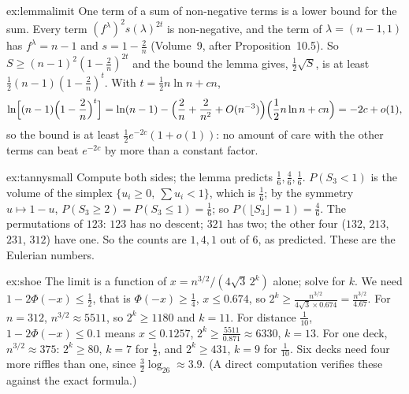 \begin{solution}{ex:lemmalimit}
\idea One term of a sum of non-negative terms is a lower bound for the sum.
\writeup Every term $(f^\lambda)^2s(\lambda)^{2t}$ is non-negative, and the term of $\lambda=(n-1,1)$ has $f^\lambda=n-1$ and $s=1-\frac2n$ (Volume~9, after Proposition~10.5). So $S\ge(n-1)^2(1-\frac2n)^{2t}$ and the bound
the lemma gives, $\frac12\sqrt S$, is at least $\frac12(n-1)(1-\frac2n)^t$. With $t=\frac12n\ln n+cn$,
\[
\ln\Bigl[(n-1)\Bigl(1-\frac2n\Bigr)^t\Bigr]=\ln(n-1)-\Bigl(\frac2n+\frac2{n^2}+O(n^{-3})\Bigr)\Bigl(\frac12n\ln n+cn\Bigr)=-2c+o(1),
\]
so the bound is at least $\frac12e^{-2c}(1+o(1))$: no amount of care with the other terms can beat $e^{-2c}$ by more than a constant factor.
\end{solution}

\begin{solution}{ex:tannysmall}
\idea Compute both sides; the lemma predicts $\frac16,\frac46,\frac16$.
\writeup $P(S_3<1)$ is the volume of the simplex $\{u_i\ge0,\ \sum u_i<1\}$, which is $\frac16$; by the symmetry $u\mapsto1-u$, $P(S_3\ge2)=P(S_3\le1)=\frac16$; so $P(\lfloor S_3\rfloor=1)=\frac46$. The permutations
of $123$: $123$ has no descent; $321$ has two; the other four ($132$, $213$, $231$, $312$) have one. So the counts are $1,4,1$ out of $6$, as predicted. These are the Eulerian numbers.
\end{solution}

\begin{solution}{ex:shoe}
\idea The limit is a function of $x=n^{3/2}/(4\sqrt3\,2^k)$ alone; solve for $k$.
\writeup We need $1-2\Phi(-x)\le\frac12$, that is $\Phi(-x)\ge\frac14$, $x\le0.674$, so $2^k\ge\frac{n^{3/2}}{4\sqrt3\times0.674}=\frac{n^{3/2}}{4.67}$. For $n=312$, $n^{3/2}\approx5511$, so $2^k\ge1180$ and $k=11$. For
distance $\frac1{10}$, $1-2\Phi(-x)\le0.1$ means $x\le0.1257$, $2^k\ge\frac{5511}{0.871}\approx6330$, $k=13$. For one deck, $n^{3/2}\approx375$: $2^k\ge80$, $k=7$ for $\frac12$, and $2^k\ge431$, $k=9$ for $\frac1{10}$. Six decks need four more riffles
than one, since $\frac32\log_26\approx3.9$. (A direct computation verifies these against the exact formula.)
\end{solution}

